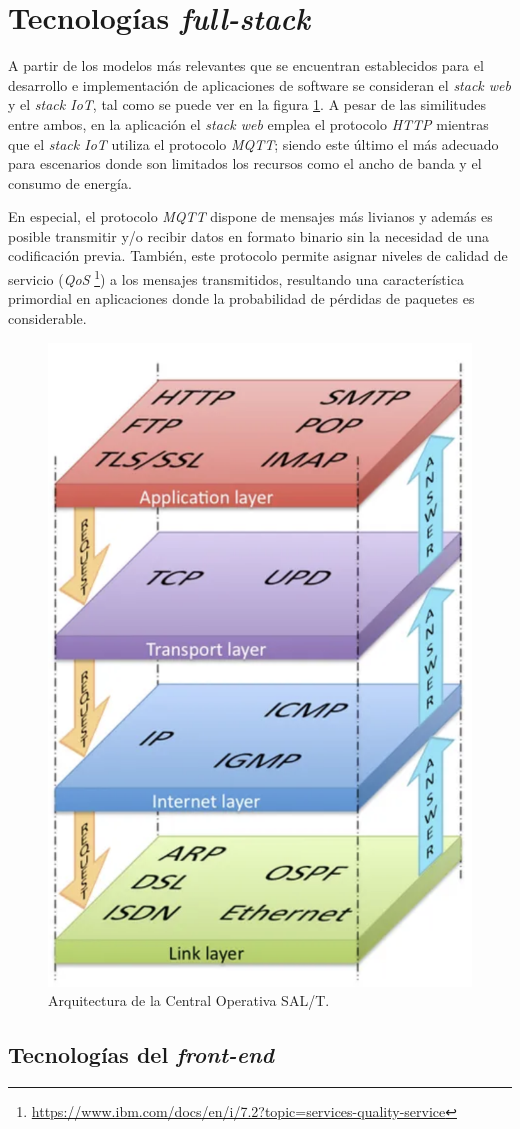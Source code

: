 \section{Tecnologías \textit{full-stack}}

A partir de los modelos más relevantes que se encuentran establecidos para el desarrollo e implementación de aplicaciones de software se consideran el \textit{stack web} y el \textit{stack IoT}, tal como se puede ver en la figura \ref{fig:diagBloques}. A pesar de las similitudes entre ambos, en la aplicación el \textit{stack web} emplea el protocolo \textit{HTTP} mientras que el \textit{stack IoT} utiliza el protocolo \textit{MQTT}; siendo este último el más adecuado para escenarios donde son limitados los recursos como el ancho de banda y el consumo de energía.

En especial, el protocolo \textit{MQTT} dispone de mensajes más livianos y además es posible transmitir y/o recibir datos en formato binario sin la necesidad de una codificación previa. También, este protocolo permite asignar niveles de calidad de servicio (\textit{QoS} \footnote{\url{https://www.ibm.com/docs/en/i/7.2?topic=services-quality-service}}) a los mensajes transmitidos, resultando una característica primordial en aplicaciones donde la probabilidad de pérdidas de paquetes es considerable.


\begin{figure}[htpb]
  \centering 
  \includegraphics[width=.4\textwidth]{Figures/tcp-ip-stack.png}
  \caption{Arquitectura de la Central Operativa SAL/T.}
  \label{fig:diagBloques}
\end{figure}


\subsection{Tecnologías del \textit{front-end}}

